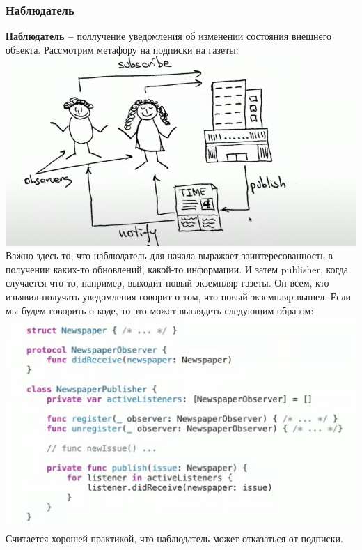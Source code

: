 \documentclass{article}
\begin{document}
    \subsubsection{Наблюдатель}
    \textbf{Наблюдатель --} поллучение уведомления об изменении состояния внешнего объекта. Рассмотрим метафору на подписки на газеты: 
    \newline
    \includegraphics[scale = 0.5]{pic/Снимок экрана 2023-07-29 в 14.59.10.png}
    \newline
    Важно здесь то, что наблюдатель для начала выражает заинтересованность в получении каких-то обновлений, какой-то информации. И затем publisher, когда случается что-то, например, выходит новый экземпляр газеты. Он всем, кто изъявил получать уведомления говорит о том, что новый экземпляр вышел. Если мы будем говорить о коде, то это может выглядеть следующим образом: 
    \newline
    \includegraphics[scale = 0.5]{pic/Снимок экрана 2023-07-29 в 15.00.49.png}
    \newline
    Считается хорошей практикой, что наблюдатель может отказаться от подписки. 
\end{document}
